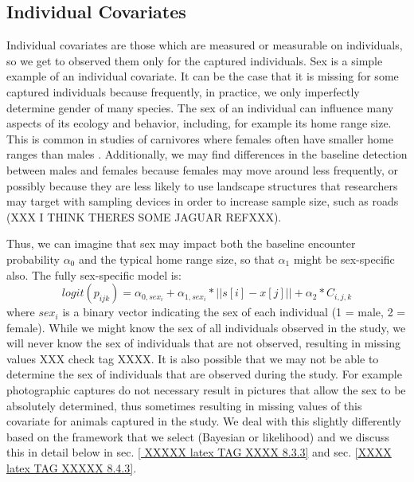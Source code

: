 \subsection{Individual Covariates}

Individual covariates are those which are measured or measurable on
individuals, so we get to observed them only for the captured
individuals. Sex is a simple example of an individual covariate. It can be the
case that it is missing for some captured individuals because
frequently, in practice, we only imperfectly determine gender of many
species.  The sex of an individual can influence many aspects of its ecology and behavior, including, for example its home range size. This is
common in studies of carnivores where females often have smaller home ranges than
males \citep{gardner_etal:2010jwm, sollmann_etal:2011}. Additionally, we may find differences in
the baseline detection between males and females because females may move around less frequently, or possibly because they are less likely to use landscape structures that researchers may target with sampling devices in order to increase sample size, such as roads (XXX I THINK THERES SOME JAGUAR REFXXX). 


Thus, we can imagine that sex may impact both the baseline encounter
probability $\alpha_{0}$ and the typical home range
size, so that
$\alpha_{1}$ might be sex-specific also.  The fully sex-specific model is:
\[
logit(p_{ijk}) = \alpha_{0,sex_{i}} + \alpha_{1, sex_{i}}*||s[i]-x[j]|| + \alpha_2*C_{i,j,k}
\]
where $sex_{i}$ is a binary vector indicating the sex of
each individual (1 = male, 2 = female).  While we might know the sex of all
individuals observed in the study, we will never know the
sex of individuals that are not observed,
resulting in missing values \citep{gardner_etal:2010jwm} XXX check tag XXXX.
It is also possible that we may not be able to determine the sex of
individuals that are observed during the study. For example photographic
captures do not necessary result in pictures that allow the sex to be absolutely
determined, thus sometimes resulting in missing values of this covariate for animals
captured in the study.   We deal with this slightly differently based on the framework
that we select (Bayesian or likelihood) and we discuss this in detail
below in sec. \ref{ XXXXX latex TAG XXXX 8.3.3} and sec. \ref{XXXX latex TAG XXXXX 8.4.3}.

\begin{comment}
XXX whole section on this below so commented out here XXXXX
\subsection{Heterogeneity}

Heterogeneity is a covariate that is completely latent.  This can
include many things such as an additive individual effect or an
individual-specific effect of distance.  We address these models
separately in Section 8.5 below and show a simple example of a finite
mixture model carried out in secr in Section 8.4.4.
\end{comment}

